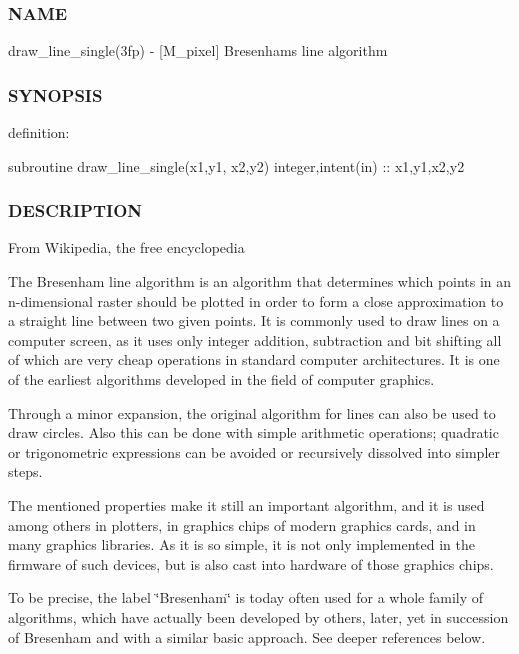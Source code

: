 \subsubsection*{N\+A\+ME}

draw\+\_\+line\+\_\+single(3fp) -\/ \mbox{[}M\+\_\+pixel\mbox{]} Bresenham\textquotesingle{}s line algorithm 

\subsubsection*{S\+Y\+N\+O\+P\+S\+IS}

definition\+:

subroutine draw\+\_\+line\+\_\+single(x1,y1, x2,y2) integer,intent(in) \+:\+: x1,y1,x2,y2

\subsubsection*{D\+E\+S\+C\+R\+I\+P\+T\+I\+ON}

From Wikipedia, the free encyclopedia

The Bresenham line algorithm is an algorithm that determines which points in an n-\/dimensional raster should be plotted in order to form a close approximation to a straight line between two given points. It is commonly used to draw lines on a computer screen, as it uses only integer addition, subtraction and bit shifting all of which are very cheap operations in standard computer architectures. It is one of the earliest algorithms developed in the field of computer graphics.

Through a minor expansion, the original algorithm for lines can also be used to draw circles. Also this can be done with simple arithmetic operations; quadratic or trigonometric expressions can be avoided or recursively dissolved into simpler steps.

The mentioned properties make it still an important algorithm, and it is used among others in plotters, in graphics chips of modern graphics cards, and in many graphics libraries. As it is so simple, it is not only implemented in the firmware of such devices, but is also cast into hardware of those graphics chips.

To be precise, the label \char`\"{}\+Bresenham\char`\"{} is today often used for a whole family of algorithms, which have actually been developed by others, later, yet in succession of Bresenham and with a similar basic approach. See deeper references below.


